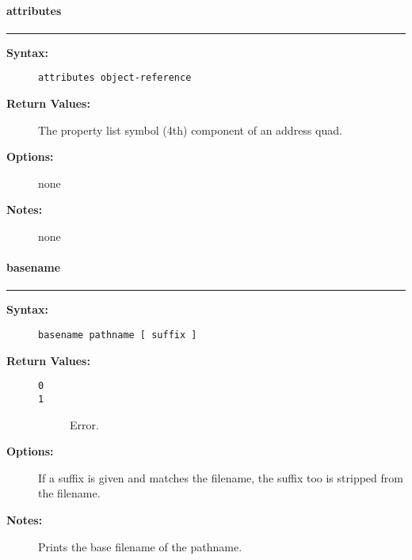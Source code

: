 \vspace {2pt}


\paragraph{attributes}

\hrule
\begin{description}
\item[{\bf Syntax:}] \mbox{}

{\tt attributes object-reference}

\item[{\bf Return Values:}] \mbox{}

The property list symbol (4th) component 
of an address quad.

\item[{\bf Options:}] \mbox{}

none  

\item[{\bf Notes:}] \mbox{}

none

\end{description}


\vspace {2pt}


\paragraph{basename}

\hrule
\begin{description}
\item[{\bf Syntax:}] \mbox{}

{\tt basename pathname [ suffix ]}

\item[{\bf Return Values:}] \mbox{}

\begin{description}
\item[{\tt 0}] \mbox{}



\item[{\tt 1}] \mbox{}

Error.

\end{description}


\item[{\bf Options:}] \mbox{}

If a suffix is given and matches the filename, 
the suffix too is stripped from the filename.

\item[{\bf Notes:}] \mbox{}

Prints the base filename of the pathname.

\end{description}


